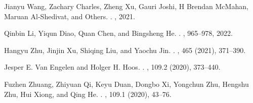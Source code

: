 \documentclass[11pt]{article}
\begin{document}
\begin{thebibliography}{10}
\begin{small}
Jianyu Wang, Zachary Charles, Zheng Xu, Gauri Joshi, H Brendan McMahan, Maruan Al-Shedivat, and Others. 
.
, 2021. 

Qinbin Li, Yiqun Diao, Quan Chen, and Bingsheng He. 
. 
, 965--978, 2022. 

Hangyu Zhu, Jinjin Xu, Shiqing Liu, and Yaochu Jin. 
.
, 465 (2021), 371--390. 

Jesper E. Van Engelen and Holger H. Hoos. 
. 
, 109.2 (2020), 373--440. 

Fuzhen Zhuang, Zhiyuan Qi, Keyu Duan, Dongbo Xi, Yongchun Zhu, Hengshu Zhu, Hui Xiong, and Qing He. 
. 
, 109.1 (2020), 43--76. 



\end{small}
\end{thebibliography}
\end{document}
